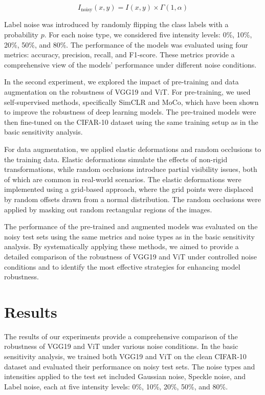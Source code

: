 \documentclass{article}
\begin{document}
\[
I_{\text{noisy}}(x, y) = I(x, y) \times \Gamma(1, \alpha)
\]

Label noise was introduced by randomly flipping the class labels with a probability \( p \). For each noise type, we considered five intensity levels: 0\%, 10\%, 20\%, 50\%, and 80\%. The performance of the models was evaluated using four metrics: accuracy, precision, recall, and F1-score. These metrics provide a comprehensive view of the models' performance under different noise conditions.

In the second experiment, we explored the impact of pre-training and data augmentation on the robustness of VGG19 and ViT. For pre-training, we used self-supervised methods, specifically SimCLR and MoCo, which have been shown to improve the robustness of deep learning models. The pre-trained models were then fine-tuned on the CIFAR-10 dataset using the same training setup as in the basic sensitivity analysis.

For data augmentation, we applied elastic deformations and random occlusions to the training data. Elastic deformations simulate the effects of non-rigid transformations, while random occlusions introduce partial visibility issues, both of which are common in real-world scenarios. The elastic deformations were implemented using a grid-based approach, where the grid points were displaced by random offsets drawn from a normal distribution. The random occlusions were applied by masking out random rectangular regions of the images.

The performance of the pre-trained and augmented models was evaluated on the noisy test sets using the same metrics and noise types as in the basic sensitivity analysis. By systematically applying these methods, we aimed to provide a detailed comparison of the robustness of VGG19 and ViT under controlled noise conditions and to identify the most effective strategies for enhancing model robustness.

\section{Results}
The results of our experiments provide a comprehensive comparison of the robustness of VGG19 and ViT under various noise conditions. In the basic sensitivity analysis, we trained both VGG19 and ViT on the clean CIFAR-10 dataset and evaluated their performance on noisy test sets. The noise types and intensities applied to the test set included Gaussian noise, Speckle noise, and Label noise, each at five intensity levels: 0\%, 10\%, 20\%, 50\%, and 80\%.
\end{document}
